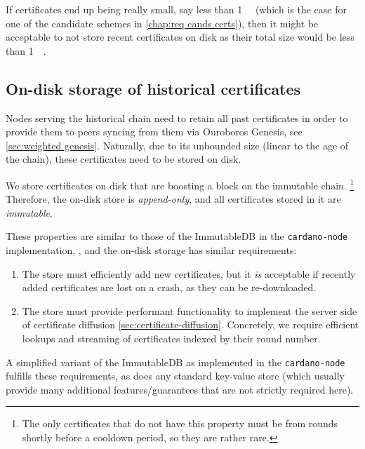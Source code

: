 If certificates end up being really small, say less than \qty{1}{\kilo\byte} (which is the case for one of the candidate schemes in \cref{chap:req cands certs}), then it might be acceptable to not store recent certificates on disk as their total size would be less than \qty{1}{\mega\byte}.

\subsection{On-disk storage of historical certificates}
Nodes serving the historical chain need to retain all past certificates in order to provide them to peers syncing from them via Ouroboros Genesis, see \cref{sec:weighted genesis}.
Naturally, due to its unbounded size (linear to the age of the chain), these certificates need to be stored on disk.

We store certificates on disk that are boosting a block on the immutable chain.%
\footnote{The only certificates that do not have this property must be from rounds shortly before a cooldown period, so they are rather rare.}
Therefore, the on-disk store is \emph{append-only}, and all certificates stored in it are \emph{immutable}.

These properties are similar to those of the ImmutableDB in the \texttt{cardano-node} implementation, \parencite[chapter~8]{consensus-storage-report}, and the on-disk storage has similar requirements:
\begin{enumerate}
\item
  The store must efficiently add new certificates, but it \emph{is} acceptable if recently added certificates are lost on a crash, as they can be re-downloaded.
\item
  The store must provide performant functionality to implement the server side of certificate diffusion \cref{sec:certificate-diffusion}.
  Concretely, we require efficient lookups and streaming of certificates indexed by their round number.
\end{enumerate}
A simplified variant of the ImmutableDB as implemented in the \texttt{cardano-node} fulfills these requirements, as does any standard key-value store (which usually provide many additional features/guarantees that are not strictly required here).

